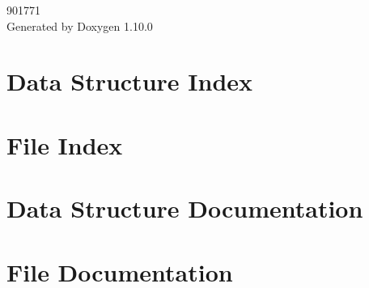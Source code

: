 \documentclass[twoside]{book}
\newcommand{\+}{\discretionary{\mbox{\scriptsize$\hookleftarrow$}}{}{}}
\newcommand{\clearemptydoublepage}{%
    \newpage{\pagestyle{empty}\cleardoublepage}%
  }
\begin{document}
  \raggedbottom
    \hypersetup{pageanchor=false,
                bookmarksnumbered=true,
                pdfencoding=unicode
               }
  \begin{titlepage}
  \vspace*{7cm}
  \begin{center}%
  {\Large 901771}\\
  \vspace*{1cm}
  {\large Generated by Doxygen 1.10.0}\\
  \end{center}
  \end{titlepage}
  \clearemptydoublepage
  \tableofcontents
  \clearemptydoublepage
  \hypersetup{pageanchor=true}
\chapter{Data Structure Index}

\chapter{File Index}

\chapter{Data Structure Documentation}

\chapter{File Documentation}


  \backmatter
  \newpage
  \clearemptydoublepage
  \printindex
\end{document}
